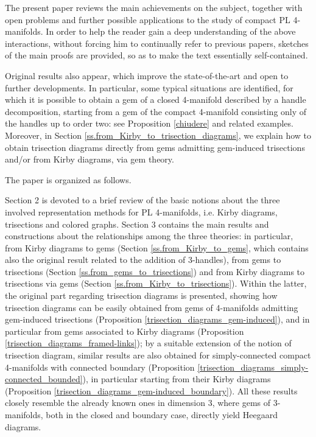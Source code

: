 \documentclass[12pt,a4paper]{article}
\begin{document}
The present paper reviews the main achievements on the subject, together with open problems and further possible applications to the study of compact PL 4-manifolds. In order to help the reader gain a deep understanding of the above interactions, without forcing him to continually refer to previous papers, sketches of the main proofs are provided, so as to make the text essentially self-contained. 

Original results also appear, which improve the state-of-the-art and open to further developments. In particular, some typical situations are identified, for which it is possible to obtain a gem of a closed 4-manifold described by a handle decomposition, starting from a gem of the compact 4-manifold consisting only of the handles up to order two: see Proposition \ref{chiudere} and related examples.       
Moreover, in Section \ref{ss.from_Kirby_to_trisection_diagrams}, we explain  how to obtain trisection diagrams directly from gems admitting gem-induced trisections and/or from Kirby diagrams, via gem theory. 

\bigskip
The paper is organized as follows. 

Section 2 is devoted to a brief review of the basic notions about the three involved representation methods for PL 4-manifolds, i.e. Kirby diagrams, trisections and colored graphs.   
Section 3 contains the main results and constructions about the relationships among the three theories: in particular, from Kirby diagrams to gems (Section \ref{ss.from_Kirby_to_gems}, which contains also the original result related to the addition of 3-handles), from gems to trisections (Section \ref{ss.from_gems_to_trisections}) and from Kirby diagrams to trisections via gems (Section \ref{ss.from_Kirby_to_trisections}).  Within the latter, the original part regarding trisection diagrams is presented, showing how trisection diagrams can be easily obtained from gems of 4-manifolds admitting gem-induced trisections (Proposition \ref{trisection_diagrams_gem-induced}), and in particular from gems associated to Kirby diagrams (Proposition \ref{trisection_diagrams_framed-links}); by a suitable extension of the notion of trisection diagram, similar results are also obtained for simply-connected compact 4-manifolds with connected boundary (Proposition \ref{trisection_diagrams_simply-connected_bounded}), in particular starting from their Kirby diagrams (Proposition \ref{trisection_diagrams_gem-induced_boundary}). All these results closely resemble the already known ones in dimension 3, where gems of 3-manifolds, both in the closed and boundary case, directly yield 
Heegaard diagrams.   
\end{document}
